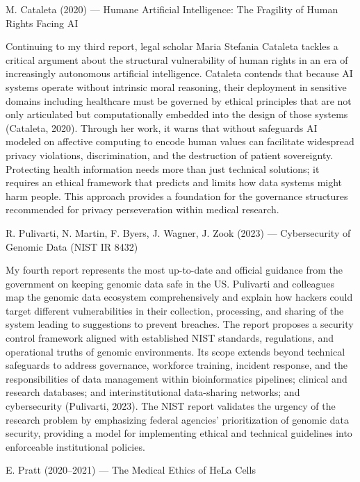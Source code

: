 \documentclass[12pt]{article}
\begin{document}
M. Cataleta (2020) — Humane Artificial Intelligence: The Fragility of Human Rights Facing AI

Continuing to my third report, legal scholar Maria Stefania Cataleta tackles a critical argument about the structural vulnerability of human rights in an era of increasingly autonomous artificial intelligence. Cataleta contends that because AI systems operate without intrinsic moral reasoning, their deployment in sensitive domains including healthcare must be governed by ethical principles that are not only articulated but computationally embedded into the design of those systems (Cataleta, 2020). Through her work, it warns that without safeguards AI modeled on affective computing to encode human values can facilitate widespread privacy violations, discrimination, and the destruction of patient sovereignty. Protecting health information needs more than just technical solutions; it requires an ethical framework that predicts and limits how data systems might harm people. This approach provides a foundation for the governance structures recommended for privacy perseveration within medical research.

R. Pulivarti, N. Martin, F. Byers, J. Wagner, J. Zook (2023) — Cybersecurity of Genomic Data (NIST IR 8432)

My fourth report represents the most up-to-date and official guidance from the government on keeping genomic data safe in the US. Pulivarti and colleagues map the genomic data ecosystem comprehensively and explain how hackers could target different vulnerabilities in their collection, processing, and sharing of the system leading to suggestions to prevent breaches. The report proposes a security control framework aligned with established NIST standards, regulations, and operational truths of genomic environments. Its scope extends beyond technical safeguards to address governance, workforce training, incident response, and the responsibilities of data management within bioinformatics pipelines; clinical and research databases; and interinstitutional data-sharing networks; and cybersecurity (Pulivarti, 2023). The NIST report validates the urgency of the research problem by emphasizing federal agencies' prioritization of genomic data security, providing a model for implementing ethical and technical guidelines into enforceable institutional policies.

E. Pratt (2020–2021) — The Medical Ethics of HeLa Cells
\end{document}
